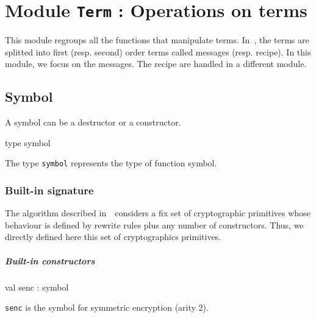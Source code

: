 \section{Module {\tt{Term}} : Operations on terms}
\label{module:Term}




\ocamldocvspace{0.5cm}



This module regroups all the functions that manipulate terms. In~\thesis, the terms
    are splitted into first (resp. second) order terms called messages (resp. recipe). 
    In this module, we focus on the messages. The recipe are handled in a different module. 



\subsection{Symbol}




A symbol can be a destructor or a constructor.



\label{type:Term.symbol}\begin{ocamldoccode}
type symbol 
\end{ocamldoccode}
\begin{ocamldocdescription}
The type {\tt{symbol}} represents the type of function symbol.


\end{ocamldocdescription}




\subsubsection{Built-in signature}




The algorithm described in~\thesis~considers a fix set of cryptographic primitives
    whose behaviour is defined by rewrite rules plus any number of constructors. Thus, we directly defined
    here this set of cryptographics primitives. 



\subparagraph{Built-in constructors}




\label{val:Term.senc}\begin{ocamldoccode}
val senc : symbol
\end{ocamldoccode}
\begin{ocamldocdescription}
{\tt{senc}} is the symbol for symmetric encryption (arity 2).


\end{ocamldocdescription}




